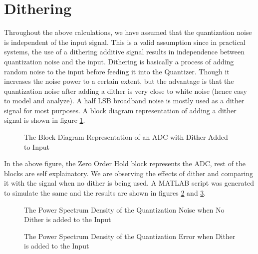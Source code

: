\documentclass[colorlinks=true,pdfstartview=FitV,linkcolor=blue,
            citecolor=red,urlcolor=magenta]{ligodoc}
\begin{document}
\section{Dithering}
Throughout the above calculations, we have assumed that the quantization noise is independent of the input signal. This is a valid assumption since in practical systems, the use of a dithering additive signal results in independence between quantization noise and the input. 
Dithering is basically a process of adding random noise to the input before feeding it into the Quantizer. Though it increases the noise power to a certain extent, but the advantage is that the quantization noise after adding a dither is very close to white noise (hence easy to model and analyze). 
A half LSB broadband noise is mostly used as a dither signal for most purposes. 
A block diagram representation of adding a dither signal is shown in figure \ref{block1}.
\begin{figure}[htbp] 
  \centering
  
  \caption{The Block Diagram Representation of an ADC with Dither Added to Input}
  \label{block1} 
\end{figure}

In the above figure, the Zero Order Hold block represents the ADC, rest of the blocks are self explainatory. We are observing the effects of dither and comparing it with the signal when no dither is being used. A MATLAB script was generated to simulate the same and the results are shown in figures \ref{PSD1} and \ref{PSD2}.
 
 \begin{figure}[htbp]
  \centering
  
  \caption{The Power Spectrum Density of the Quantization Noise when No Dither is added to the Input}
 \label{PSD1}
\end{figure}

 \begin{figure}[htbp]
 
  \centering
  
  \caption{The Power Spectrum Density of the Quantization Error when Dither is added to the Input}
 \label{PSD2}
\end{figure}
\end{document}
